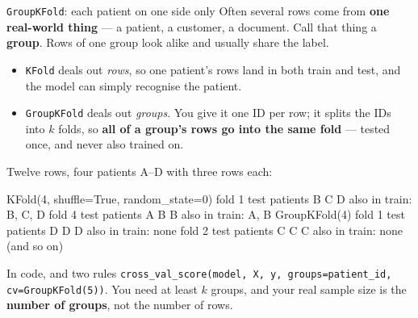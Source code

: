 \documentclass[aspectratio=169]{beamer}
\begin{document}
\begin{frame}[fragile,shrink=8]{\texttt{GroupKFold}: each patient on one side only}
  \small Often several rows come from \textbf{one real-world thing} --- a
  patient, a customer, a document. Call that thing a \textbf{group}. Rows of
  one group look alike and usually share the label.
  \begin{itemize}
    \item \texttt{KFold} deals out \emph{rows}, so one patient's rows land in
      both train and test, and the model can simply recognise the patient.
    \item \texttt{GroupKFold} deals out \emph{groups}. You give it one ID per
      row; it splits the IDs into $k$ folds, so \textbf{all of a group's rows
      go into the same fold} --- tested once, and never also trained on.
  \end{itemize}
  Twelve rows, four patients A--D with three rows each:
\begin{outblk}
   KFold(4, shuffle=True, random_state=0)
      fold 1  test patients B C D   also in train: B, C, D
      fold 4  test patients A B B   also in train: A, B
   GroupKFold(4)
      fold 1  test patients D D D   also in train: none
      fold 2  test patients C C C   also in train: none      (and so on)
\end{outblk}
  \begin{block}{In code, and two rules}
    \small \texttt{cross\_val\_score(model, X, y, groups=patient\_id,
    cv=GroupKFold(5))}. You need at least $k$ groups, and your real sample
    size is the \textbf{number of groups}, not the number of rows.
  \end{block}
\end{frame}
\end{document}

